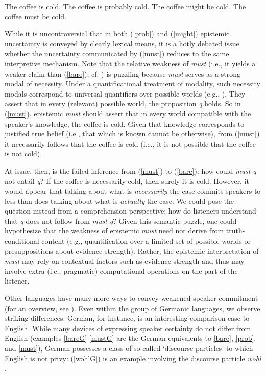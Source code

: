 \documentclass[11pt]{article}
\begin{document}
\begin{exe}
	\ex\label{english} \begin{xlist}
		\ex\label{bare} The coffee is cold.
		\ex\label{prob} The coffee is probably cold.
		\ex\label{might} The coffee might be cold.
		\ex\label{must} The coffee must be cold.
	\end{xlist}
\end{exe}


While it is uncontroversial that in both (\ref{prob}) and (\ref{might}) epistemic uncertainty is conveyed by clearly lexical means, it is a hotly debated issue whether the uncertainty communicated by (\ref{must}) reduces to the same interpretive mechanism. Note that the relative weakness of \emph{must} (i.e., it yields a weaker claim than (\ref{bare}), cf. \citealp{karttunen1972}) is puzzling because \emph{must} serves as a strong modal of necessity. Under a quantificational treatment of modality, such necessity modals correspond to universal quantifiers over possible worlds (e.g., \citealp{kratzer1991}). They assert that in every (relevant) possible world, the proposition \emph{q} holds. So in (\ref{must}), epistemic \emph{must} should assert that in every world compatible with the speaker's knowledge, the coffee is cold. Given that knowledge corresponds to justified true belief (i.e., that which is known cannot be otherwise), from (\ref{must}) it necessarily follows that the coffee is cold (i.e., it is not possible that the coffee is not cold).

At issue, then, is the failed inference from (\ref{must}) to (\ref{bare}): how could \emph{must q} not entail \emph{q}? If the coffee is necessarily cold, then surely it is cold. However, it would appear that talking about what is \emph{necessarily} the case commits speakers to less than does talking about what is \emph{actually} the case. We could pose the question instead from a comprehension perspective: how do listeners understand that \emph{q} does not follow from \emph{must q}? Given this semantic puzzle, one could hypothesize that the weakness of epistemic \emph{must} need not derive from truth-conditional content (e.g., quantification over a limited set of possible worlds or presuppositions about evidence strength). Rather, the epistemic interpretation of \emph{must} may rely on contextual factors such as evidence strength and thus may involve extra (i.e., pragmatic) computational operations on the part of the listener.

Other languages have many more ways to convey weakened speaker commitment (for an overview, see \citealp{Aikhenvald2004,Drubig2001,Nuyts2001}). Even within the group of Germanic languages, we observe striking differences. German, for instance, is an interesting comparison case to English. While many devices of expressing speaker certainty do not differ from English (examples \ref{bareG}-\ref{mustG} are the German equivalents to \ref{bare}, \ref{prob}, and \ref{must}), German possesses a class of so-called `discourse particles' to which English is not privy: (\ref{wohlG}) is an example involving the discourse particle \emph{wohl} \citep{Zimmermann2004}. 
\end{document}
